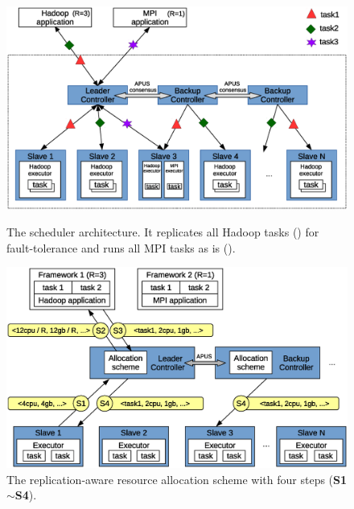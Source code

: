 \vspace{.1in}
\begin{figure}[!htb]
    \begin{minipage}{.48\textwidth}
        \vspace{-.3in}
        \includegraphics[width=0.34\textheight]{figures/scheduler_arch.eps}
         \vspace{-.4in}
        \caption{The \tripod scheduler architecture. It replicates all Hadoop 
tasks () for fault-tolerance and runs all MPI tasks as is ().}
        \label{fig:scheduler-arch}
    \end{minipage}
    \hspace{0.16in}
    \begin{minipage}{0.48\textwidth}
        \vspace{-.3in}
        \includegraphics[width=0.34\textheight]{figures/scheduler_flow.eps}
        \vspace{-.4in}
        \caption{The replication-aware resource allocation scheme with four 
steps (\textbf{S1}$\sim$\textbf{S4}).}
        \label{fig:scheduler-workflow}
    \end{minipage}
\end{figure}

